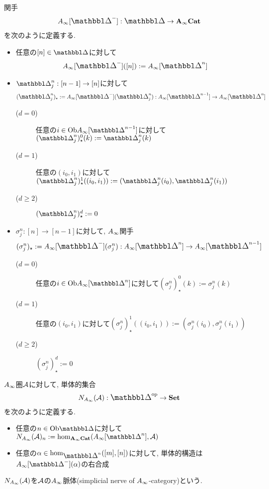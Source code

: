 \documentclass[uplatex, a4paper, 14Q, dvipdfmx]{jsarticle}
\begin{document}
\begin{definition}
  関手
  \begin{align*}
    \Ainf[\Prism^-] : \Prism \to \Ainfcat
  \end{align*}
  を次のように定義する.
  \begin{itemize}
    \item 任意の$[n] \in \Prism$に対して
    \begin{align*}
      \Ainf[\Prism^-]([n]) := \Ainf[\Prism^n]
    \end{align*}
    \item $\Prism^n_j : [n-1] \to [n]$に対して
    \begin{align*}
      (\Prism^n_j)_\star := \Ainf[\Prism^-](\Prism^n_j) : \Ainf[\Prism^{n-1}] \to \Ainf[\Prism^n]
    \end{align*}
    \begin{description}
      \item[($d=0$)] 任意の$i \in \Ob\Ainf[\Prism^{n-1}]$に対して$(\Prism^n_j)_\star^0(k) := \Prism^n_j(k)$
      \item[($d=1$)] 任意の$(i_0,i_1)$に対して$(\Prism^n_j)_\star^1((i_0,i_1)) := (\Prism^n_j(i_0),\Prism^n_j(i_1))$
      \item[($d \geq 2$)] $(\Prism^n_j)_\star^d := 0$
    \end{description}
    \item $\sigma^n_j : [n] \to [n-1]$に対して, $\Ainf$関手
    \begin{align*}
      (\sigma^n_j)_\star := \Ainf[\Prism^-](\sigma^n_j) : \Ainf[\Prism^n] \to \Ainf[\Prism^{n-1}]
    \end{align*}
    \begin{description}
      \item[($d=0$)] 任意の$i \in \Ob\Ainf[\Prism^n]$に対して$(\sigma^n_j)_\star^0(k) := \sigma^n_j(k)$
      \item[($d=1$)] 任意の$(i_0,i_1)$に対して$(\sigma^n_j)_\star^1((i_0,i_1)) := (\sigma^n_j(i_0),\sigma^n_j(i_1))$
      \item[($d \geq 2$)] $(\sigma^n_j)_\star^d := 0$
    \end{description}
  \end{itemize}
\end{definition}

\begin{definition}[$\Ainf$脈体] \label{def_Ainf_nerve}
  $\Ainf$圏$\mathcal{A}$に対して, 単体的集合
  \begin{align*}
    N_{\Ainf}(\A) : \Prism^\myop \to \set
  \end{align*}
  を次のように定義する.
  \begin{itemize}
    \item 任意の$n \in \Ob\Prism$に対して$N_{\Ainf}(\A)_n := \hom_{\Ainfcat} (\Ainf[\Prism^n],\A)$
    \item 任意の$\alpha \in \hom_{\Prism^n}([m],[n])$に対して, 単体的構造は$\Ainf[\Prism^-](\alpha)$の右合成
  \end{itemize}  
  $N_{A_{\infty}}(\mathcal{A})$を$\mathcal{A}$の$\Ainf$脈体(simplicial nerve of $\Ainf$-category)という.
\end{definition}
\end{document}
